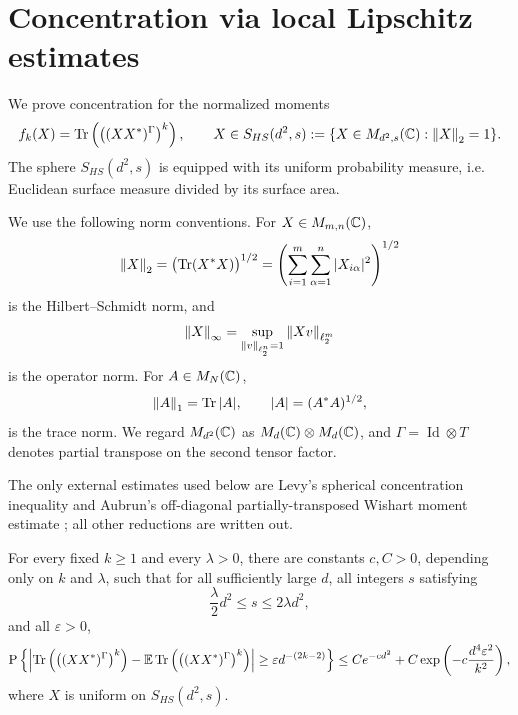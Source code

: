 \section{Concentration via local Lipschitz estimates}
\label{app:second_approach}

\makeatletter
{}
\makeatother

We prove concentration for the normalized moments
\[
  f_k(X)=\operatorname{Tr}\left(\left((XX^*)^\Gamma\right)^k\right),
  \qquad
  X\in S_{HS}(d^2,s):=\{X\in M_{d^2,s}(\mathbb{C}):\left\lVert X\right\rVert_2=1\}.
\]
The sphere \(S_{HS}(d^2,s)\) is equipped with its uniform probability
measure, i.e. Euclidean surface measure divided by its surface area.

We use the following norm conventions.  For \(X\in M_{m,n}(\mathbb{C})\),
\[
  \left\lVert X\right\rVert_2=\bigl(\operatorname{Tr}(X^*X)\bigr)^{1/2}
  =
  \left(\sum_{i=1}^m\sum_{\alpha=1}^n |X_{i\alpha}|^2\right)^{1/2}
\]
is the Hilbert--Schmidt norm, and
\[
  \left\lVert X\right\rVert_\infty
  =
  \sup_{\left\lVert v\right\rVert_{\ell_2^n}=1}\left\lVert Xv\right\rVert_{\ell_2^m}
\]
is the operator norm.  For \(A\in M_N(\mathbb{C})\),
\[
  \left\lVert A\right\rVert_1=\operatorname{Tr}|A|,\qquad |A|=(A^*A)^{1/2},
\]
is the trace norm.  We regard \(M_{d^2}(\mathbb{C})\) as
\(M_d(\mathbb{C})\otimes M_d(\mathbb{C})\), and
\(\Gamma=\operatorname{Id}\otimes T\) denotes partial
transpose on the second tensor factor.

The only external estimates used below are Levy's spherical concentration
inequality \cite[Corollary~5.17]{AubrunSzarek2017} and Aubrun's
off-diagonal partially-transposed Wishart moment estimate
\cite[Lemma~3.4]{Aubrun12}; all other reductions are written out.

\begin{theorem}
\label{thm:appendixB-local-concentration}
For every fixed \(k\ge1\) and every \(\lambda>0\), there are constants
\(c,C>0\), depending only on \(k\) and \(\lambda\), such that for all
sufficiently large \(d\), all integers \(s\) satisfying
\[
  \frac{\lambda}{2}d^2\le s\le 2\lambda d^2,
\]
and all \(\varepsilon>0\),
\[
  \operatorname{P}\left\{
    \left|
      \operatorname{Tr}\left(\left((XX^*)^\Gamma\right)^k\right)
      -
      \operatorname{\mathbb{E}}\operatorname{Tr}\left(\left((XX^*)^\Gamma\right)^k\right)
    \right|
    \ge
    \varepsilon d^{-(2k-2)}
  \right\}
  \le
  C e^{-c d^2}
  +
  C\exp\left(-c\frac{d^4\varepsilon^2}{k^2}\right),
\]
where \(X\) is uniform on \(S_{HS}(d^2,s)\).
\end{theorem}

